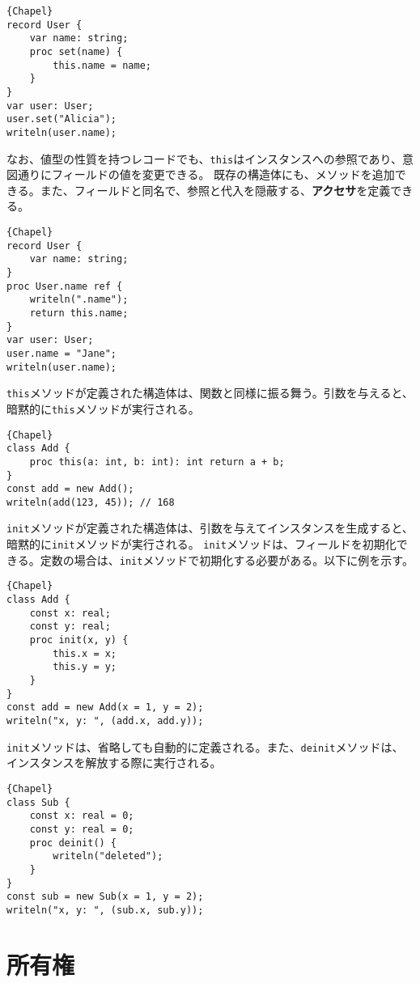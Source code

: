 \documentclass[10pt,a4paper]{book}
\begin{document}
\begin{Verbatim}{Chapel}
record User {
	var name: string;
	proc set(name) {
		this.name = name;
	}
}
var user: User;
user.set("Alicia");
writeln(user.name);
\end{Verbatim}

なお、値型の性質を持つレコードでも、\texttt{this}はインスタンスへの参照であり、意図通りにフィールドの値を変更できる。
既存の構造体にも、メソッドを追加できる。また、フィールドと同名で、参照と代入を隠蔽する、\textbf{アクセサ}を定義できる。

\begin{Verbatim}{Chapel}
record User {
	var name: string;
}
proc User.name ref {
	writeln(".name");
	return this.name;
}
var user: User;
user.name = "Jane";
writeln(user.name);
\end{Verbatim}

\texttt{this}メソッドが定義された構造体は、関数と同様に振る舞う。引数を与えると、暗黙的に\texttt{this}メソッドが実行される。

\begin{Verbatim}{Chapel}
class Add {
	proc this(a: int, b: int): int return a + b;
}
const add = new Add();
writeln(add(123, 45)); // 168
\end{Verbatim}

\texttt{init}メソッドが定義された構造体は、引数を与えてインスタンスを生成すると、暗黙的に\texttt{init}メソッドが実行される。
\texttt{init}メソッドは、フィールドを初期化できる。定数の場合は、\texttt{init}メソッドで初期化する必要がある。以下に例を示す。

\begin{Verbatim}{Chapel}
class Add {
	const x: real;
	const y: real;
	proc init(x, y) {
		this.x = x;
		this.y = y;
	}
}
const add = new Add(x = 1, y = 2);
writeln("x, y: ", (add.x, add.y));
\end{Verbatim}

\texttt{init}メソッドは、省略しても自動的に定義される。また、\texttt{deinit}メソッドは、インスタンスを解放する際に実行される。

\begin{Verbatim}{Chapel}
class Sub {
	const x: real = 0;
	const y: real = 0;
	proc deinit() {
		writeln("deleted");
	}
}
const sub = new Sub(x = 1, y = 2);
writeln("x, y: ", (sub.x, sub.y));
\end{Verbatim}

\section{所有権}
\end{document}
